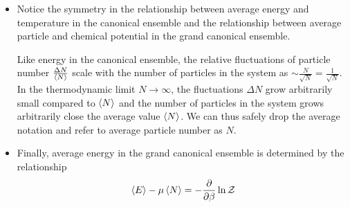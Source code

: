 \documentclass[11pt, a4paper]{article}
\begin{document}
\begin{itemize}
\begin{itemize}
		\item Notice the symmetry in the relationship between average energy and temperature in the canonical ensemble and the relationship between average particle and chemical potential in the grand canonical ensemble. 
		
		Like energy in the canonical ensemble, the relative fluctuations of particle number $ \frac{\Delta N}{\expval{N}} $ scale with the number of particles in the system as $ \sim \frac{N}{\sqrt{N}} = \frac{1}{\sqrt{N}}$. In the thermodynamic limit $ N \to \infty $, the fluctuations $ \Delta N $ grow arbitrarily small compared to $ \expval{N} $ and the number of particles in the system grows arbitrarily close the average value $ \expval{N} $. We can thus safely drop the average notation and refer to average particle number as $ N $.
		
		\item Finally, average energy in the grand canonical ensemble is determined by the relationship
		\begin{equation*}
			\expval{E} - \mu \expval{N} = - \pdv{}{\beta}\ln \mathcal{Z}
		\end{equation*}
	\end{itemize}
	
\end{itemize}
\end{document}
